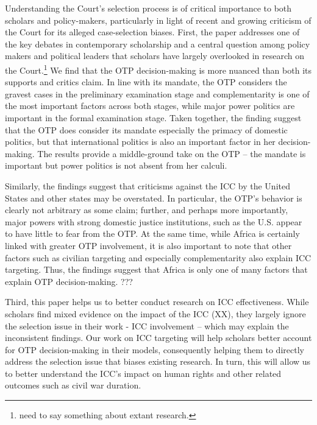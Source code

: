 Understanding the Court's selection process is of critical importance to both scholars and policy-makers, particularly in light of recent and growing criticism of the Court for its alleged case-selection biases. First, the paper addresses one of the key debates in contemporary scholarship and a central question among policy makers and political leaders that scholars have largely overlooked in research on the Court.\footnote{need to say something about extant research.} We find that the OTP decision-making is more nuanced than both its supports and critics claim. In line with its mandate, the OTP considers the gravest cases in the preliminary examination stage and complementarity is one of the most important factors across both stages, while major power politics are important in the formal examination stage. Taken together, the finding suggest that the OTP does consider its mandate especially the primacy of domestic politics, but that international politics is also an important factor in her decision-making. The results provide a middle-ground take on the OTP -- the mandate is important but power politics is not absent from her calculi.

Similarly, the findings suggest that criticisms against the ICC by the United States and other states may be overstated. In particular, the OTP's behavior is clearly not arbitrary as some claim; further, and perhaps more importantly, major powers with strong domestic justice institutions, such as the U.S. appear to have little to fear from the OTP. At the same time, while Africa is certainly linked with greater OTP involvement, it is also important to note that other factors such as civilian targeting and especially complementarity also explain ICC targeting. Thus, the findings suggest that Africa is only one of many factors that explain OTP decision-making. ???

Third, this paper helps us to better conduct research on ICC effectiveness. While scholars find mixed evidence on the impact of the ICC (XX), they largely ignore the selection issue in their work - ICC involvement -- which may explain the inconsistent findings. Our work on ICC targeting will help scholars better account for OTP decision-making in their models, consequently helping them to directly address the selection issue that biases existing research. In turn, this will allow us to better understand the ICC's impact on human rights and other related outcomes such as civil war duration.

